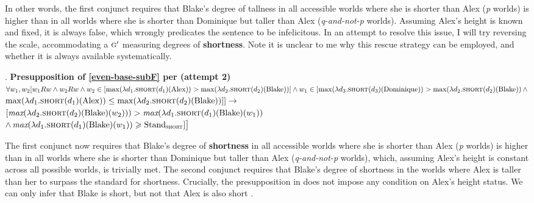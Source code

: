 \documentclass[12pt,letterpaper]{scrartcl}
\begin{document}
In other words, the first conjunct requires that Blake's degree of tallness in all accessible worlds where she is shorter than Alex (\textit{p} worlds) is higher than in all worlds where she is shorter than Dominique but taller than Alex (\textit{q-and-not-p} worlds). Assuming Alex's height is known and fixed, it is always false, which wrongly predicates the sentence to be infelicitous. In an attempt to resolve this issue, I will try reversing the scale, accommodating a $\textsc{g}'$ measuring degrees of \textbf{shortness}. Note it is unclear to me why this rescue strategy can be employed, and whether it is always available systematically.

\ex. \textbf{Presupposition of \ref{even-base-subF} per \cite{greenberg_revised_2018} (attempt 2)} \\ 
    $\forall w_1, w_2 [w_1Rw \land w_2Rw \land w_2 \in [\max(\lambda d_1.\textsc{short}(d_1)(\text{Alex})) > \max(\lambda d_2.\textsc{short}(d_2)(\text{Blake}))]  
    \land 
    w_1 \in [\max(\lambda d_3.\textsc{short}(d_3)(\text{Dominique})) >  \max(\lambda d_2.\textsc{short}(d_2)(\text{Blake})) \, \land$ \\  \hspace*{\fill} $\max(\lambda d_1.\textsc{short}(d_1)(\text{Alex})) \leq \max(\lambda d_2.\textsc{short}(d_2)(\text{Blake}))]] \rightarrow
    $ \\
    $[\textit{max}(\lambda d_2.\textsc{short}(d_2)(\text{Blake})(w_2))) > \textit{max}(\lambda d_1.\textsc{short}(d_1)(\text{Blake})(w_1))$ \\ 
    $\land \, \textit{max}(\lambda d_1.\textsc{short}(d_1)(\text{Blake})(w_1)) \geqslant \text{Stand}_{\textsc{short}} ] \big]$

The first conjunct now requires that Blake's degree of \textbf{shortness} in all accessible worlds where she is shorter than Alex (\textit{p} worlds) is higher than in all worlds where she is shorter than Dominique but taller than Alex (\textit{q-and-not-p} worlds), which, assuming Alex's height is constant across all possible worlds, is trivially met. The second conjunct requires that Blake's degree of shortness in the worlds where Alex is taller than her to surpass the standard for shortness. Crucially, the presupposition in \Last does not impose any condition on Alex's height status. We can only infer that Blake is short, but not that Alex is also short%
. 
\end{document}
